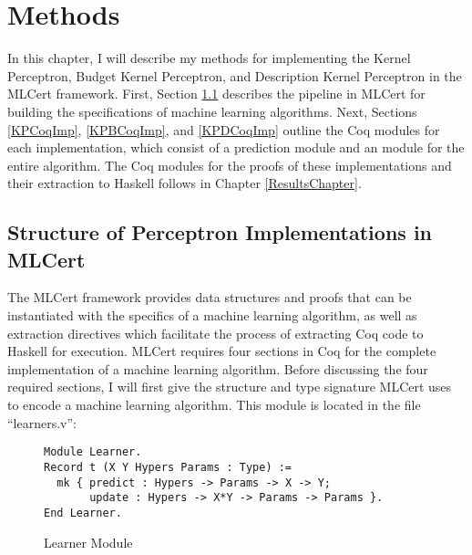 \chapter{Methods}\label{MethodsChapter}
In this chapter, I will describe my methods for implementing the Kernel Perceptron, Budget Kernel Perceptron, and Description Kernel Perceptron in the MLCert framework. First, Section \ref{MLCertStruct} describes the pipeline in MLCert for building the specifications of machine learning algorithms. Next, Sections \ref{KPCoqImp}, \ref{KPBCoqImp}, and \ref{KPDCoqImp} outline the Coq modules for each implementation, which consist of a prediction module and an module for the entire algorithm. The Coq modules for the proofs of these implementations and their extraction to Haskell follows in Chapter \ref{ResultsChapter}.
\section{Structure of Perceptron Implementations in MLCert}\label{MLCertStruct}
The MLCert framework provides data structures and proofs that can be instantiated with the specifics of a machine learning algorithm, as well as extraction directives which facilitate the process of extracting Coq code to Haskell for execution. MLCert requires four sections in Coq for the complete implementation of a machine learning algorithm. Before discussing the four required sections, I will first give the structure and type signature MLCert uses to encode a machine learning algorithm. This module is located in the file ``learners.v'':

\begin{figure}
    \caption{Learner Module}
    \label{LearnerDef}
    \begin{lstlisting}
Module Learner.
Record t (X Y Hypers Params : Type) :=
  mk { predict : Hypers -> Params -> X -> Y;
       update : Hypers -> X*Y -> Params -> Params }.
End Learner.
    \end{lstlisting}
\end{figure}

